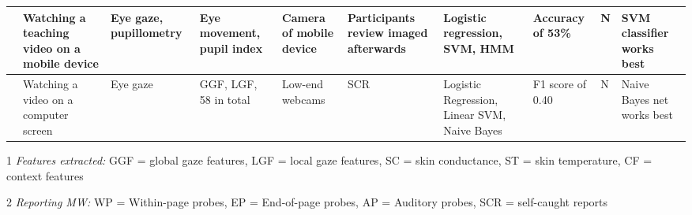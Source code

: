 \begin{landscape}
\begin{xtabular}{p{25mm}p{28mm}p{30mm}p{22mm}p{38mm}p{22mm}p{23mm}p{22mm}p{15mm}p{3cm}}
\cite{ISI:000443429900018} & Watching a teaching video on a mobile device & Eye gaze, pupillometry & Eye movement, pupil index & Camera of mobile device & Participants review imaged afterwards & Logistic regression, SVM, HMM & Accuracy of 53\% & N & SVM classifier works best\\ \midrule 
\cite{Zhao2017ScalableApproach} & Watching a video on a computer screen & Eye gaze & GGF, LGF, 58 in total & Low-end webcams & SCR & Logistic Regression, Linear SVM, Naive Bayes & F1 score of 0.40 & N & Naive Bayes net works best\\ \midrule
\bottomrule
\end{xtabular}
\begin{ThreePartTable}
        \begin{tablenotes}
        \small
        \item[1] \emph{Features extracted:} GGF = global gaze features, LGF = local gaze features, SC = skin conductance, ST = skin temperature, CF = context features
        \item[2] \emph{Reporting MW:} WP = Within-page probes, EP = End-of-page probes, AP = Auditory probes, SCR = self-caught reports
        \end{tablenotes}
\end{ThreePartTable}
\end{landscape}
\restoregeometry %
\twocolumn       %